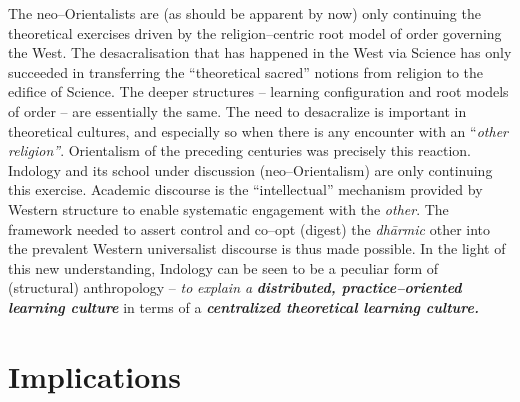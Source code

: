 The neo–Orientalists are (as should be apparent by now) only continuing the theoretical exercises driven by the religion–centric root model of order governing the West. The desacralisation that has happened in the West via Science has only succeeded in transferring the “theoretical sacred” notions from religion to the edifice of Science. The deeper structures – learning configuration and root models of order – are essentially the same. The need to desacralize is important in theoretical cultures, and especially so when there is any encounter with an “\textit{other religion”}. Orientalism of the preceding centuries was precisely this reaction. Indology and its school under discussion (neo–Orientalism) are only continuing this exercise. Academic discourse is the “intellectual” mechanism provided by Western structure to enable systematic engagement with the \textit{other}. The framework needed to assert control and co–opt (digest) the \textit{dhārmic} other into the prevalent Western universalist discourse is thus made possible. In the light of this new understanding, Indology can be seen to be a peculiar form of (structural) anthropology – \textit{to} \textit{explain a} \textbf{\textit{distributed, practice–oriented learning culture}} in terms of a \textbf{\textit{centralized theoretical learning culture.}}


\section*{Implications}

